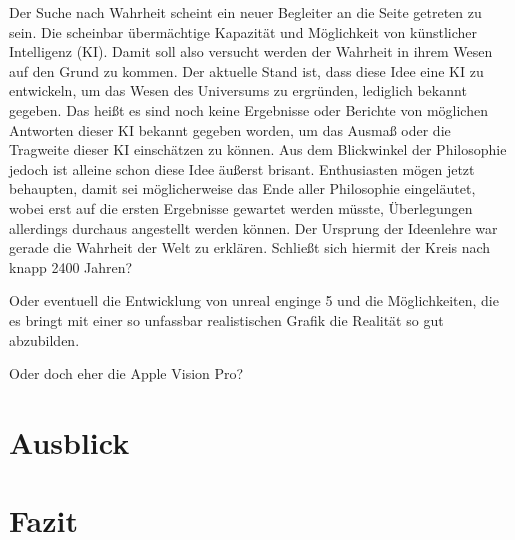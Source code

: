 \documentclass[12pt]{article}
\begin{document}
Der Suche nach Wahrheit scheint ein neuer Begleiter an die Seite getreten zu sein. Die scheinbar übermächtige Kapazität und Möglichkeit von künstlicher Intelligenz (KI). Damit soll also versucht werden der Wahrheit in ihrem Wesen auf den Grund zu kommen. Der aktuelle Stand ist, dass diese Idee eine KI zu entwickeln, um das Wesen des Universums zu ergründen, lediglich bekannt gegeben. Das heißt es sind noch keine Ergebnisse oder Berichte von möglichen Antworten dieser KI bekannt gegeben worden, um das Ausmaß oder die Tragweite dieser KI einschätzen zu können. Aus dem Blickwinkel der Philosophie jedoch ist alleine schon diese Idee äußerst brisant. Enthusiasten mögen jetzt behaupten, damit sei möglicherweise das Ende aller Philosophie eingeläutet, wobei erst auf die ersten Ergebnisse gewartet werden müsste, Überlegungen allerdings durchaus angestellt werden können.
Der Ursprung der Ideenlehre war gerade die Wahrheit der Welt zu erklären. Schließt sich hiermit der Kreis nach knapp 2400 Jahren?

Oder eventuell die Entwicklung von unreal enginge 5 und die Möglichkeiten, die es bringt mit einer so unfassbar realistischen Grafik die Realität so gut abzubilden.

Oder doch eher die Apple Vision Pro?
\section{Ausblick}
\section{Fazit}
\newpage
\nocite{politeia}
\nocite{Parmenides}
\printbibliography
\end{document}
